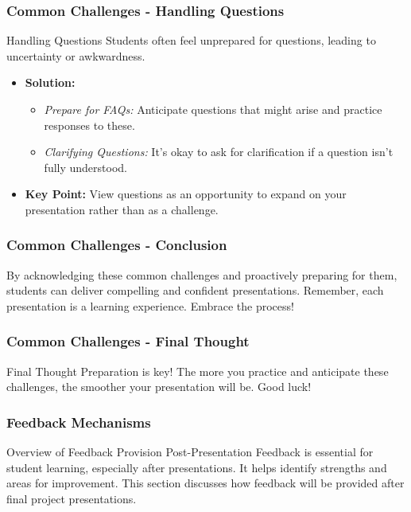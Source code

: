 \documentclass[aspectratio=169]{beamer}
\begin{document}
\begin{frame}[fragile]
  \frametitle{Common Challenges - Handling Questions}
  \begin{block}{Handling Questions}
    Students often feel unprepared for questions, leading to uncertainty or awkwardness.
  \end{block}
  \begin{itemize}
    \item \textbf{Solution:}
    \begin{itemize}
      \item \textit{Prepare for FAQs:} Anticipate questions that might arise and practice responses to these.
      \item \textit{Clarifying Questions:} It’s okay to ask for clarification if a question isn’t fully understood.
    \end{itemize}
    \item \textbf{Key Point:} View questions as an opportunity to expand on your presentation rather than as a challenge.
  \end{itemize}
\end{frame}

\begin{frame}[fragile]
  \frametitle{Common Challenges - Conclusion}
  By acknowledging these common challenges and proactively preparing for them, students can deliver compelling and confident presentations. Remember, each presentation is a learning experience. Embrace the process!
\end{frame}

\begin{frame}[fragile]
  \frametitle{Common Challenges - Final Thought}
  \begin{block}{Final Thought}
    Preparation is key! The more you practice and anticipate these challenges, the smoother your presentation will be. Good luck!
  \end{block}
\end{frame}

\begin{frame}[fragile]
  \frametitle{Feedback Mechanisms}
  \begin{block}{Overview of Feedback Provision Post-Presentation}
    Feedback is essential for student learning, especially after presentations. It helps identify strengths and areas for improvement. This section discusses how feedback will be provided after final project presentations.
  \end{block}
\end{frame}
\end{document}
